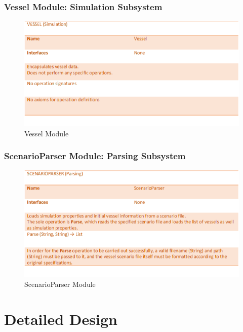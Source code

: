 \documentclass[12pt]{article}
\begin{document}
\subsubsection{Vessel Module: Simulation Subsystem}
\begin{figure}[h!]
    \centering
    \includegraphics[scale=0.9]{2_2_8_vessel_(simulation)}
    \caption{Vessel Module}
\end{figure}

\subsubsection{ScenarioParser Module: Parsing Subsystem}
\begin{figure}[h!]
    \centering
    \includegraphics[scale=0.9]{2_2_9_scenarioparser_(parsing)}
    \caption{ScenarioParser Module}
\end{figure}
\clearpage




\section{Detailed Design}
\end{document}
